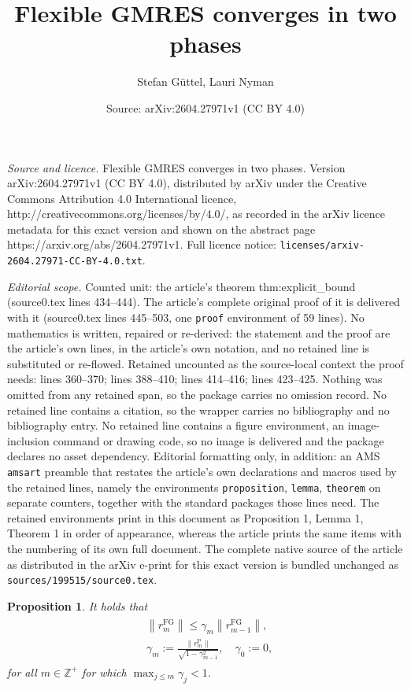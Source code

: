 \documentclass[10pt,a4paper]{amsart}
\title{Flexible GMRES converges in two phases}
\author{Stefan G\"uttel, Lauri Nyman}
\date{Source: arXiv:2604.27971v1 (CC BY 4.0)}
\newtheorem{proposition}{Proposition}
\def\Z{\mathbb{Z}}
\begin{document}
\maketitle

\noindent\emph{Source and licence.} Flexible GMRES converges in two phases. Version arXiv:2604.27971v1 (CC BY 4.0), distributed by arXiv under the Creative Commons Attribution 4.0 International licence, http://creativecommons.org/licenses/by/4.0/, as recorded in the arXiv licence metadata for this exact version and shown on the abstract page https://arxiv.org/abs/2604.27971v1. Full licence notice: \texttt{licenses/arxiv-2604.27971-CC-BY-4.0.txt}.\par\smallskip

\noindent\textit{Editorial scope.} Counted unit: the article's theorem thm:explicit\_bound (source0.tex lines 434--444). The article's complete original proof of it is delivered with it (source0.tex lines 445--503, one \texttt{proof} environment of 59 lines). No mathematics is written, repaired or re-derived: the statement and the proof are the article's own lines, in the article's own notation, and no retained line is substituted or re-flowed.  Retained uncounted as the source-local context the proof needs: lines 360--370; lines 388--410; lines 414--416; lines 423--425.  Nothing was omitted from any retained span, so the package carries no omission record.  No retained line contains a citation, so the wrapper carries no bibliography and no bibliography entry.  No retained line contains a figure environment, an image-inclusion command or drawing code, so no image is delivered and the package declares no asset dependency.  Editorial formatting only, in addition: an AMS \texttt{amsart} preamble that restates the article's own declarations and macros used by the retained lines, namely the environments \texttt{proposition}, \texttt{lemma}, \texttt{theorem} on separate counters, together with the standard packages those lines need.  The retained environments print in this document as Proposition 1, Lemma 1, Theorem 1 in order of appearance, whereas the article prints the same items with the numbering of its own full document.  The complete native source of the article as distributed in the arXiv e-print for this exact version is bundled unchanged as \texttt{sources/199515/source0.tex}.
\begin{proposition} \label{prop:recurrence_gamma}
    It holds that
    \begin{align}
        \begin{aligned} \label{eq:successive_rG_gamma}
             & \left\|r_m^{\mathrm{FG}}\right\| \leq \gamma_m \left\|r_{m-1}^{\mathrm{FG}}\right\|, \\
             & \gamma_m := \frac{\|r_m^{\mathrm{P}}\|}{\sqrt{1-\gamma_{m-1}^2}}, \quad \gamma_0 := 0,
        \end{aligned}
    \end{align}
    for all $m \in \Z^+$ for which $\max_{j \leq m} \gamma_{j}
        < 1$.
\end{proposition}
\end{document}
